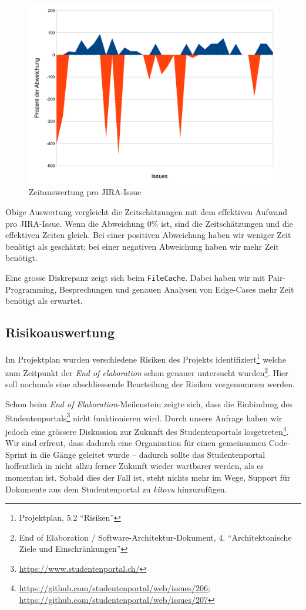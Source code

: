 \documentclass[a4paper]{article}
\begin{document}
\begin{figure}[H]
  \includegraphics[width=\linewidth]{./img/time_per_issue.png}
  \caption{Zeitauswertung pro JIRA-Issue\protect\footnotemark}
\end{figure}

Obige Auswertung vergleicht die Zeitschätzungen mit dem effektiven Aufwand pro JIRA-Issue.
Wenn die Abweichung 0\% ist, sind die Zeitschätzungen und die effektiven Zeiten gleich.
Bei einer positiven Abweichung haben wir weniger Zeit benötigt als geschätzt;
bei einer negativen Abweichung haben wir mehr Zeit benötigt.

Eine grosse Diskrepanz zeigt sich beim \verb|FileCache|.
Dabei haben wir mit Pair-Programming, Besprechungen und genauen Analysen von Edge-Cases mehr Zeit benötigt als erwartet.

\subsection{Risikoauswertung}

Im Projektplan wurden verschiedene Risiken des Projekts
identifiziert\footnote{Projektplan, 5.2 ``Risiken''} welche zum Zeitpunkt der
\emph{End of elaboration} schon genauer untersucht wurden\footnote{End of
Elaboration / Software-Architektur-Dokument, 4. ``Architektonische Ziele und
Einschränkungen''}. Hier soll nochmals eine abschliessende Beurteilung der
Risiken vorgenommen werden.

Schon beim \emph{End of Elaboration}-Meilenstein zeigte sich, dass die
Einbindung des Studentenportals\footnote{\url{https://www.studentenportal.ch/}}
nicht funktionieren wird. Durch unsere Anfrage haben wir jedoch eine grössere
Diskussion zur Zukunft des Studentenportals
losgetreten\footnote{\url{https://github.com/studentenportal/web/issues/206}; \\
\url{https://github.com/studentenportal/web/issues/207}}. Wir sind erfreut, dass
dadurch eine Organisation für einen gemeinsamen Code-Sprint in die Gänge
geleitet wurde -- dadurch sollte das Studentenportal hoffentlich in nicht allzu
ferner Zukunft wieder wartbarer werden, als es momentan ist. Sobald dies der
Fall ist, steht nichts mehr im Wege, Support für Dokumente aus dem
Studentenportal zu \emph{kitovu} hinzuzufügen.
\end{document}
